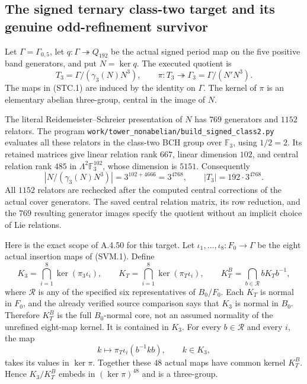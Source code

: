 \subsection{The signed ternary class-two target and its genuine odd-refinement survivor}

Let $\Gamma=\Gamma_{0,5}$, let $q:\Gamma\twoheadrightarrow Q_{192}$
be the actual signed period map on the five positive band generators,
and put $N=\ker q$.  The executed quotient is
\[
 T_3=\Gamma/(\gamma_3(N)N^3),\qquad
 \pi:T_3\twoheadrightarrow\Gamma_3=\Gamma/(N'N^3).
 \tag{STC.1}
\]
The maps in (STC.1) are induced by the identity on $\Gamma$.
The kernel of $\pi$ is an elementary abelian three-group, central
in the image of $N$.

The literal Reidemeister--Schreier presentation of $N$ has $769$
generators and $1152$ relators.  The program
\texttt{work/tower\_nonabelian/build\_signed\_class2.py} evaluates all
these relators in the class-two BCH group over $\mathbb F_3$, using
$1/2=2$.  Its retained matrices give linear relation rank $667$,
linear dimension $102$, and central relation rank $485$ in
$\Lambda^2\mathbb F_3^{102}$, whose dimension is $5151$.
Consequently
\[
 |N/(\gamma_3(N)N^3)|=3^{102+4666}=3^{4768},
 \qquad |T_3|=192\cdot3^{4768}.
 \tag{STC.2}
\]
All $1152$ relators are rechecked after the computed central
corrections of the actual cover generators.  The saved central
relation matrix, its row reduction, and the $769$ resulting
generator images specify the quotient without an implicit choice
of Lie relations.

Here is the exact scope of A.4.50 for this target.  Let
$\iota_1,\ldots,\iota_8:F_0\to\Gamma$ be the eight actual insertion
maps of (SVM.1).  Define
\[
 K_3=\bigcap_{i=1}^8\ker(\pi_3\iota_i),\qquad
 K_T=\bigcap_{i=1}^8\ker(\pi_T\iota_i),\qquad
 K_T^B=\bigcap_{b\in\mathcal R}bK_Tb^{-1},
 \tag{STC.3}
\]
where $\mathcal R$ is any of the specified six representatives of
$B_0/F_0$.  Each $K_T$ is normal in $F_0$, and the already verified
source comparison says that $K_3$ is normal in $B_0$.  Therefore
$K_T^B$ is the full $B_0$-normal core, not an assumed normality of
the unrefined eight-map kernel.  It is contained in $K_3$.
For every $b\in\mathcal R$ and every $i$, the map
\[
 k\longmapsto\pi_T\iota_i(b^{-1}kb),\qquad k\in K_3,
 \tag{STC.4}
\]
takes its values in $\ker\pi$.  Together these $48$ actual maps
have common kernel $K_T^B$.  Hence $K_3/K_T^B$ embeds in
$(\ker\pi)^{48}$ and is a three-group.

